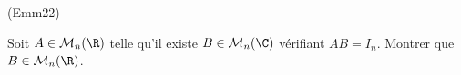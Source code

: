 \begin{tiny}(Emm22)\end{tiny} Soit $A \in \mathcal{M}_n(\R)$ telle qu'il existe $B \in \mathcal{M}_n(\C)$ vérifiant 
$AB = I_n$. Montrer que $B \in \mathcal{M}_n(\R)$.
